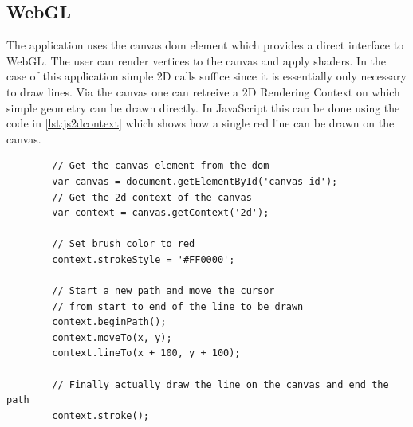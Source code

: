 %
%

\subsection{WebGL}

%     

The application uses the canvas dom element which provides a direct interface to WebGL. The user can render vertices to the canvas and apply shaders.
In the case of this application simple 2D calls suffice since it is essentially only necessary to draw lines.
Via the canvas one can retreive a 2D Rendering Context on which simple geometry can be drawn directly.
In JavaScript this can be done using the code in \ref{lst:js2dcontext} which shows how a single red line can be drawn on the canvas.

\begin{tcolorbox}[
        title={
            \refstepcounter{listing}
            Listing \thelisting: JavaScript ``Get 2D Rendering Context''
            \label{lst:js2dcontext}
            \addcontentsline{lol}{listing}{\protect\numberline{\thelisting}}
        }
    ]
    \begin{verbatim}
        // Get the canvas element from the dom
        var canvas = document.getElementById('canvas-id');
        // Get the 2d context of the canvas
        var context = canvas.getContext('2d');

        // Set brush color to red
        context.strokeStyle = '#FF0000';

        // Start a new path and move the cursor
        // from start to end of the line to be drawn
        context.beginPath();
        context.moveTo(x, y);
        context.lineTo(x + 100, y + 100);

        // Finally actually draw the line on the canvas and end the path
        context.stroke();
    \end{verbatim}
\end{tcolorbox}

